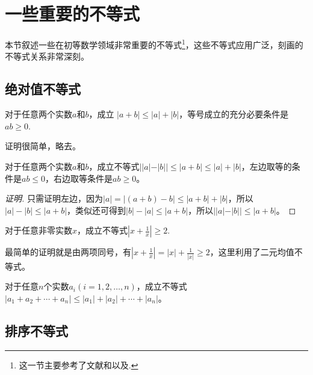 
\section{一些重要的不等式}
\label{sec:some-important-inequation}

本节叙述一些在初等数学领域非常重要的不等式\footnote{这一节主要参考了文献\cite{contest-math-course}和\cite{caculus-course}以及\cite{olympic-math}.}，这些不等式应用广泛，刻画的不等式关系非常深刻。

\subsection{绝对值不等式}
\label{sec:absolute-value-inequality}

\begin{theorem}
  对于任意两个实数$a$和$b$，成立 $|a+b| \leqslant |a| + |b|$，等号成立的充分必要条件是$ab \geqslant 0$.
\end{theorem}

证明很简单，略去。

\begin{inference}
  对于任意两个实数$a$和$b$，成立不等式$||a|-|b|| \leqslant |a+b| \leqslant |a| + |b|$，左边取等的条件是$ab \leqslant 0$，右边取等条件是$ab \geqslant 0$。
\end{inference}

\begin{proof}[证明]
  只需证明左边，因为$|a|=|(a+b)-b| \leqslant |a+b| + |b|$，所以$|a|-|b| \leqslant |a+b|$，类似还可得到$|b|-|a| \leqslant |a+b|$，所以$||a|-|b|| \leqslant |a+b|$。
\end{proof}

\begin{example}
  对于任意非零实数$x$，成立不等式$\left| x+\frac{1}{x} \right| \geqslant 2$.

  最简单的证明就是由两项同号，有$\left| x+\frac{1}{x} \right| = |x|+\frac{1}{|x|} \geqslant 2$，这里利用了二元均值不等式。
\end{example}

\begin{inference}
  对于任意$n$个实数$a_i(i=1,2,\ldots,n)$，成立不等式$|a_1+a_2+\cdots+a_n| \leqslant |a_1| + |a_2| + \cdots + |a_n|$。
\end{inference}

\subsection{排序不等式}

